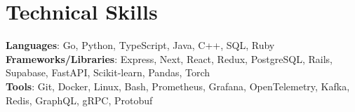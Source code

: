 \documentclass[letterpaper,11pt]{article}
\begin{document}
\section{Technical Skills}
 \begin{itemize}[leftmargin=0.15in, label={}]
    \small{\item{
     \textbf{Languages}{: Go, Python, TypeScript, Java, C++, SQL, Ruby} \\
     \textbf{Frameworks/Libraries}{: Express, Next, React, Redux, PostgreSQL, Rails, Supabase, FastAPI, Scikit-learn, Pandas, Torch} \\
     \textbf{Tools}{: Git, Docker, Linux, Bash, Prometheus, Grafana, OpenTelemetry, Kafka, Redis, GraphQL, gRPC, Protobuf} }}
 \end{itemize}

%
\end{document}
